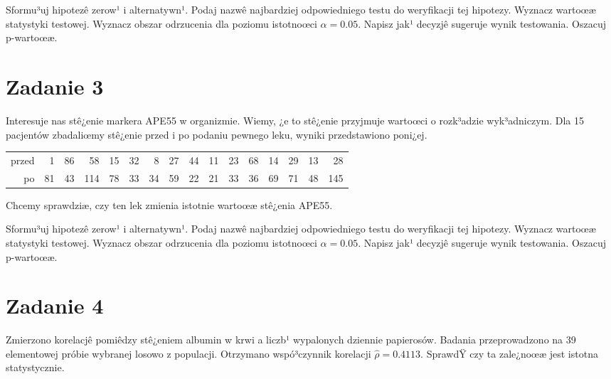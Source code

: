 \documentclass[a4paper,12pt]{article}
\begin{document}
  Sformu³uj hipotezê zerow¹ i alternatywn¹. 
  Podaj nazwê najbardziej odpowiedniego testu do weryfikacji tej hipotezy. 
  Wyznacz wartoœæ statystyki testowej. 
  Wyznacz obszar odrzucenia dla poziomu istotnoœci $\alpha=0.05$. 
  Napisz jak¹ decyzjê sugeruje wynik testowania. Oszacuj p-wartoœæ. \vspace{1cm} 

  \section*{Zadanie 3}
     
  Interesuje nas stê¿enie markera APE55  w organizmie. 
  Wiemy, ¿e to stê¿enie przyjmuje wartoœci o rozk³adzie wyk³adniczym. 
  Dla 15 pacjentów zbadaliœmy stê¿enie przed i po podaniu pewnego leku, 
  wyniki przedstawiono poni¿ej.
  
  \vspace{0.5cm} 
  \noindent\begin{center} 
\begin{tabular}{rrrrrrrrrrrrrrrr}
  \hline
  \hline
przed & 1 & 86 & 58 & 15 & 32 & 8 & 27 & 44 & 11 & 23 & 68 & 14 & 29 & 13 & 28 \\
  po & 81 & 43 & 114 & 78 & 33 & 34 & 59 & 22 & 21 & 33 & 36 & 69 & 71 & 48 & 145 \\
   \hline
\end{tabular}
 
  \end{center} 
  \vspace{0.5cm}
  
  Chcemy sprawdziæ, czy ten lek zmienia istotnie wartoœæ stê¿enia APE55.
  
  Sformu³uj hipotezê zerow¹ i alternatywn¹. 
  Podaj nazwê najbardziej odpowiedniego testu do weryfikacji tej hipotezy. 
  Wyznacz wartoœæ statystyki testowej. 
  Wyznacz obszar odrzucenia dla poziomu istotnoœci $\alpha=0.05$. 
  Napisz jak¹ decyzjê sugeruje wynik testowania. Oszacuj p-wartoœæ. \vspace{1cm} 

  \section*{Zadanie 4}
     
     Zmierzono korelacjê pomiêdzy stê¿eniem albumin w krwi a liczb¹ wypalonych dziennie papierosów. 
     Badania przeprowadzono na 39 elementowej próbie wybranej losowo z populacji. 
     Otrzymano wspó³czynnik korelacji $\hat\rho = 0.4113 $. 
     SprawdŸ czy ta zale¿noœæ jest istotna statystycznie. 
     
\end{document}
